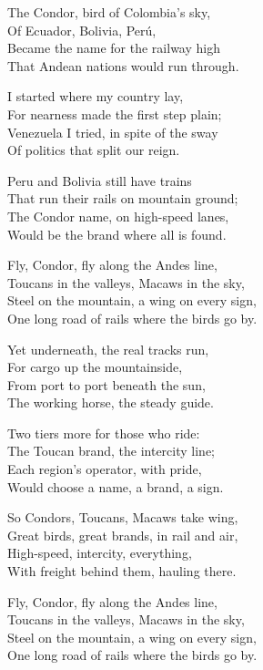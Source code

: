 \begin{lyrics}
The Condor, bird of Colombia’s sky,\\
Of Ecuador, Bolivia, Perú,\\
Became the name for the railway high\\
That Andean nations would run through.

I started where my country lay,\\
For nearness made the first step plain;\\
Venezuela I tried, in spite of the sway\\
Of politics that split our reign.

Peru and Bolivia still have trains\\
That run their rails on mountain ground;\\
The Condor name, on high-speed lanes,\\
Would be the brand where all is found.

Fly, Condor, fly along the Andes line,\\
Toucans in the valleys, Macaws in the sky,\\
Steel on the mountain, a wing on every sign,\\
One long road of rails where the birds go by.

Yet underneath, the real tracks run,\\
For cargo up the mountainside,\\
From port to port beneath the sun,\\
The working horse, the steady guide.

Two tiers more for those who ride:\\
The Toucan brand, the intercity line;\\
Each region’s operator, with pride,\\
Would choose a name, a brand, a sign.

So Condors, Toucans, Macaws take wing,\\
Great birds, great brands, in rail and air,\\
High-speed, intercity, everything,\\
With freight behind them, hauling there.

Fly, Condor, fly along the Andes line,\\
Toucans in the valleys, Macaws in the sky,\\
Steel on the mountain, a wing on every sign,\\
One long road of rails where the birds go by.
\end{lyrics}

